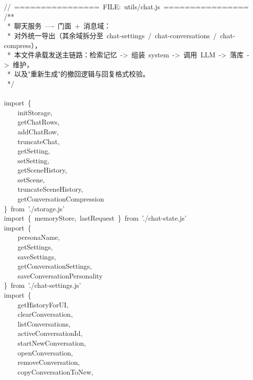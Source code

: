 \documentclass[a4paper,10pt]{article}
\begin{document}
{\ttfamily\footnotesize\raggedright
\mbox{}\\
\mbox{}\\
//~================~FILE:~utils/chat.js~================\\
/**\\
~*~聊天服务~----~门面~+~消息域：\\
~*~对外统一导出（其余域拆分至~chat-settings~/~chat-conversations~/~chat-compress），\\
~*~本文件承载发送主链路：检索记忆~->~组装~system~->~调用~LLM~->~落库~->~维护，\\
~*~以及"重新生成"的撤回逻辑与回复格式校验。\\
~*/\\
\mbox{}\\
import~\{\\
~~~~initStorage,\\
~~~~getChatRows,\\
~~~~addChatRow,\\
~~~~truncateChat,\\
~~~~getSetting,\\
~~~~setSetting,\\
~~~~getSceneHistory,\\
~~~~setScene,\\
~~~~truncateSceneHistory,\\
~~~~getConversationCompression\\
\}~from~'./storage.js'\\
import~\{~memoryStore,~lastRequest~\}~from~'./chat-state.js'\\
import~\{\\
~~~~personaName,\\
~~~~getSettings,\\
~~~~saveSettings,\\
~~~~getConversationSettings,\\
~~~~saveConversationPersonality\\
\}~from~'./chat-settings.js'\\
import~\{\\
~~~~getHistoryForUI,\\
~~~~clearConversation,\\
~~~~listConversations,\\
~~~~activeConversationId,\\
~~~~startNewConversation,\\
~~~~openConversation,\\
~~~~removeConversation,\\
~~~~copyConversationToNew,\\
}
\end{document}
